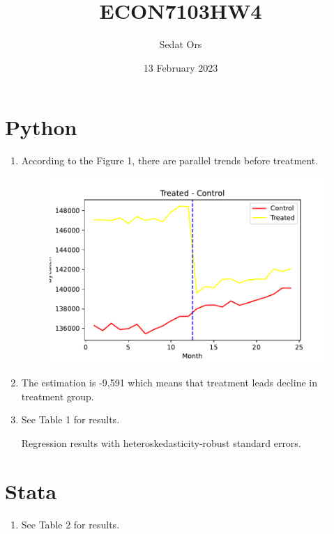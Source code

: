 \documentclass{article}
\title{ECON7103HW4}
\author{Sedat Ors}
\date{13 February 2023}
\begin{document}
\maketitle

\section{Python}
\vspace{0.5cm}
\begin{enumerate}
\item 
\noindent According to the Figure 1, there are parallel trends before treatment. 

\begin{figure}[]
    \centering
     \includegraphics{hw4Q1.pdf}
    \caption{}
    \label{tab:question3}
\end{figure}


\item The estimation is -9,591 which means that treatment leads decline in treatment group. 

\item
\noindent See Table 1 for results.
\vspace{0.5cm}
\begin{table}[]
    \centering
    
    \caption{Regression results with heteroskedasticity-robust standard errors.}
    \label{tab:question3}
\end{table}


\end{enumerate}

\section{Stata}
\vspace{0.5cm}
\begin{enumerate}
\item
\noindent See Table 2 for results.
\begin{table}[]
    \centering
    
    \caption{}
\end{table}

\end{enumerate}
\end{document}
